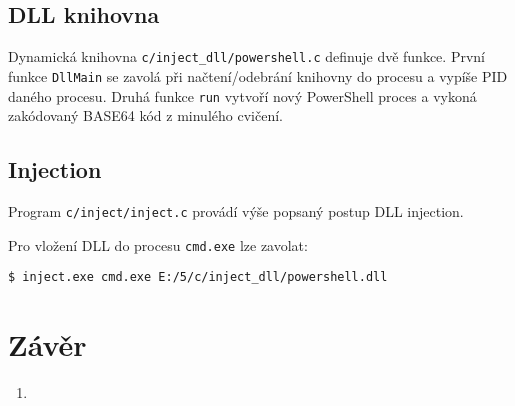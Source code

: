 \documentclass[12pt,a4paper]{article}
\begin{document}
\subsection{DLL knihovna}
Dynamická knihovna \texttt{c/inject\_dll/powershell.c} definuje dvě funkce.
První funkce \texttt{DllMain} se zavolá při načtení/odebrání knihovny do procesu a vypíše PID daného procesu.
Druhá funkce \texttt{run} vytvoří nový PowerShell proces a vykoná zakódovaný BASE64 kód z minulého cvičení.


\subsection{Injection}
Program \texttt{c/inject/inject.c} provádí výše popsaný postup DLL injection.

Pro vložení DLL do procesu \texttt{cmd.exe} lze zavolat:
\begin{verbatim}
$ inject.exe cmd.exe E:/5/c/inject_dll/powershell.dll
\end{verbatim}

\section{Závěr}
\begin{enumerate}
	\item 
\end{enumerate}
\end{document}
